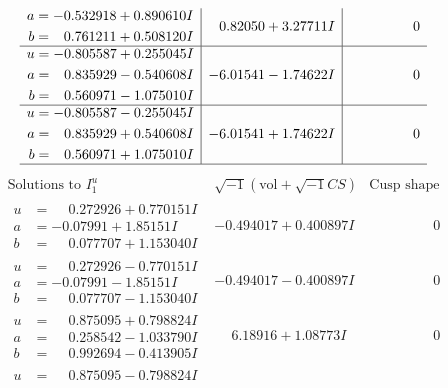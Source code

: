 \documentclass[1p]{elsarticle_modified}
\theoremstyle{definition}
\newcommand{\I}{\sqrt{-1}}
\begin{document}
$$\begin{array}{c|c|c}
\begin{aligned}
a &= -0.532918 + 0.890610 I \\
b &= \phantom{-}0.761211 + 0.508120 I\end{aligned}
 & \phantom{-}0.82050 + 3.27711 I & \phantom{-0.000000 } 0 \\ \hline\begin{aligned}
u &= -0.805587 + 0.255045 I \\
a &= \phantom{-}0.835929 - 0.540608 I \\
b &= \phantom{-}0.560971 - 1.075010 I\end{aligned}
 & -6.01541 - 1.74622 I & \phantom{-0.000000 } 0 \\ \hline\begin{aligned}
u &= -0.805587 - 0.255045 I \\
a &= \phantom{-}0.835929 + 0.540608 I \\
b &= \phantom{-}0.560971 + 1.075010 I\end{aligned}
 & -6.01541 + 1.74622 I & \phantom{-0.000000 } 0\\
 \hline 
 \end{array}$$\newpage$$\begin{array}{c|c|c}  
\text{Solutions to }I^u_{1}& \I (\text{vol} + \sqrt{-1}CS) & \text{Cusp shape}\\
 \hline 
\begin{aligned}
u &= \phantom{-}0.272926 + 0.770151 I \\
a &= -0.07991 + 1.85151 I \\
b &= \phantom{-}0.077707 + 1.153040 I\end{aligned}
 & -0.494017 + 0.400897 I & \phantom{-0.000000 } 0 \\ \hline\begin{aligned}
u &= \phantom{-}0.272926 - 0.770151 I \\
a &= -0.07991 - 1.85151 I \\
b &= \phantom{-}0.077707 - 1.153040 I\end{aligned}
 & -0.494017 - 0.400897 I & \phantom{-0.000000 } 0 \\ \hline\begin{aligned}
u &= \phantom{-}0.875095 + 0.798824 I \\
a &= \phantom{-}0.258542 - 1.033790 I \\
b &= \phantom{-}0.992694 - 0.413905 I\end{aligned}
 & \phantom{-}6.18916 + 1.08773 I & \phantom{-0.000000 } 0 \\ \hline\begin{aligned}
u &= \phantom{-}0.875095 - 0.798824 I \\

\end{aligned}
\end{array}$$
\end{document}

